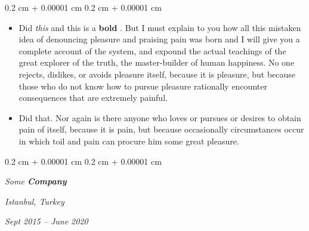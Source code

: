 \documentclass[10pt, letterpaper]{article}
\newenvironment{highlights}{
    \begin{itemize}[
        topsep=0.10 cm,
        parsep=0.10 cm,
        partopsep=0pt,
        itemsep=0pt,
        leftmargin=0.4 cm + 10pt
    ]
}{
    \end{itemize}
} %
\newenvironment{onecolentry}{
    \begin{adjustwidth}{
        0.2 cm + 0.00001 cm
    }{
        0.2 cm + 0.00001 cm
    }
}{
    \end{adjustwidth}
} %
\newenvironment{twocolentry}[2][]{
    \onecolentry
    \def\secondColumn{#2}
    \setcolumnwidth{\fill, 4.5 cm}
    \begin{paracol}{2}
}{
    \switchcolumn \raggedleft \secondColumn
    \end{paracol}
    \endonecolentry
} %
\let\hrefWithoutArrow\href
\renewcommand{\href}[2]{\hrefWithoutArrow{#1}{\ifthenelse{\equal{#2}{}}{ }{#2 }\raisebox{.15ex}{\footnotesize \faExternalLink*}}}
\begin{document}
        \vspace{0.10 cm}
        \begin{onecolentry}
            \begin{highlights}
                \item Did \textit{this} and this is a \textbf{bold} \href{https://example.com}{link}. But I must explain to you how all this mistaken idea of denouncing pleasure and praising pain was born and I will give you a complete account of the system, and expound the actual teachings of the great explorer of the truth, the master-builder of human happiness. No one rejects, dislikes, or avoids pleasure itself, because it is pleasure, but because those who do not know how to pursue pleasure rationally encounter consequences that are extremely painful.
                \item Did that. Nor again is there anyone who loves or pursues or desires to obtain pain of itself, because it is pain, but because occasionally circumstances occur in which toil and pain can procure him some great pleasure.
            \end{highlights}
        \end{onecolentry}


        \vspace{0.2 cm}

            \begin{twocolentry}{
        \textit{Istanbul, Turkey}

        \textit{Sept 2015 – June 2020}    }
                \textbf{}

                \textit{Some \textbf{Company}}
            \end{twocolentry}
\end{document}
